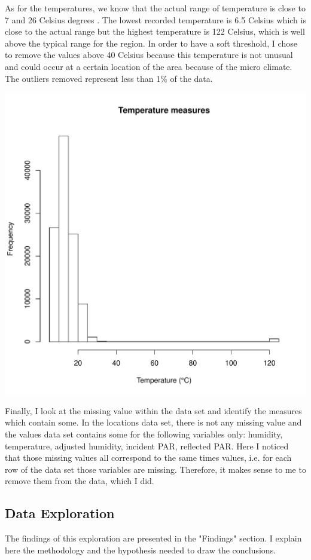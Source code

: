 \documentclass[11pt]{article}\usepackage[]{graphicx}\usepackage[]{color}
\newenvironment{knitrout}{}{} %
\begin{document}
As for the temperatures, we know that the actual range of temperature is close to 7 and 26 Celsius degrees \cite{weatherspark}. The lowest recorded temperature is 6.5 Celsius which is close to the actual range but the highest temperature is 122 Celsius, which is well above the typical range for the region. In order to have a soft threshold, I chose to remove the values above 40 Celsius because this temperature is not unusual and could occur at a certain location of the area because of the micro climate. The outliers removed represent less than 1\% of the data.

\begin{knitrout}
\color{fgcolor}

{\centering \includegraphics[width=0.6\linewidth]{figure/unnamed-chunk-6-1} 

}



\end{knitrout}


Finally, I look at the missing value within the data set and identify the measures which contain some. In the locations data set, there is not any missing value and the values data set contains some for the following variables only: humidity, temperature, adjusted humidity, incident PAR, reflected PAR. Here I noticed that those missing values all correspond to the same times values, i.e. for each row of the data set those variables are missing. Therefore, it makes sense to me to remove them from the data, which I did.



\subsection{Data Exploration}
The findings of this exploration are presented in the "Findings" section. I explain here the methodology and the hypothesis needed to draw the conclusions.
\end{document}
